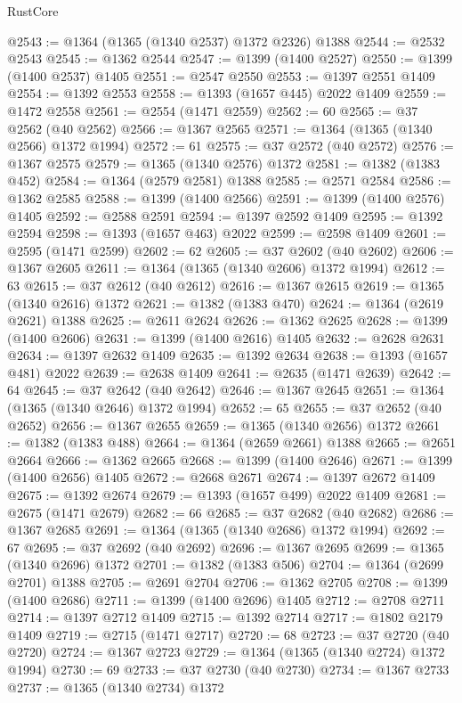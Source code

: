 \begin{lexlean}{RustCore}
\begin{coremodule}
@2543 := @1364 (@1365 (@1340 @2537) @1372 @2326) @1388
@2544 := @2532 @2543
@2545 := @1362 @2544
@2547 := @1399 (@1400 @2527)
@2550 := @1399 (@1400 @2537) @1405
@2551 := @2547 @2550
@2553 := @1397 @2551 @1409
@2554 := @1392 @2553
@2558 := @1393 (@1657 @445) @2022 @1409
@2559 := @1472 @2558
@2561 := @2554 (@1471 @2559)
@2562 := 60
@2565 := @37 @2562 (@40 @2562)
@2566 := @1367 @2565
@2571 := @1364 (@1365 (@1340 @2566) @1372 @1994)
@2572 := 61
@2575 := @37 @2572 (@40 @2572)
@2576 := @1367 @2575
@2579 := @1365 (@1340 @2576) @1372
@2581 := @1382 (@1383 @452)
@2584 := @1364 (@2579 @2581) @1388
@2585 := @2571 @2584
@2586 := @1362 @2585
@2588 := @1399 (@1400 @2566)
@2591 := @1399 (@1400 @2576) @1405
@2592 := @2588 @2591
@2594 := @1397 @2592 @1409
@2595 := @1392 @2594
@2598 := @1393 (@1657 @463) @2022
@2599 := @2598 @1409
@2601 := @2595 (@1471 @2599)
@2602 := 62
@2605 := @37 @2602 (@40 @2602)
@2606 := @1367 @2605
@2611 := @1364 (@1365 (@1340 @2606) @1372 @1994)
@2612 := 63
@2615 := @37 @2612 (@40 @2612)
@2616 := @1367 @2615
@2619 := @1365 (@1340 @2616) @1372
@2621 := @1382 (@1383 @470)
@2624 := @1364 (@2619 @2621) @1388
@2625 := @2611 @2624
@2626 := @1362 @2625
@2628 := @1399 (@1400 @2606)
@2631 := @1399 (@1400 @2616) @1405
@2632 := @2628 @2631
@2634 := @1397 @2632 @1409
@2635 := @1392 @2634
@2638 := @1393 (@1657 @481) @2022
@2639 := @2638 @1409
@2641 := @2635 (@1471 @2639)
@2642 := 64
@2645 := @37 @2642 (@40 @2642)
@2646 := @1367 @2645
@2651 := @1364 (@1365 (@1340 @2646) @1372 @1994)
@2652 := 65
@2655 := @37 @2652 (@40 @2652)
@2656 := @1367 @2655
@2659 := @1365 (@1340 @2656) @1372
@2661 := @1382 (@1383 @488)
@2664 := @1364 (@2659 @2661) @1388
@2665 := @2651 @2664
@2666 := @1362 @2665
@2668 := @1399 (@1400 @2646)
@2671 := @1399 (@1400 @2656) @1405
@2672 := @2668 @2671
@2674 := @1397 @2672 @1409
@2675 := @1392 @2674
@2679 := @1393 (@1657 @499) @2022 @1409
@2681 := @2675 (@1471 @2679)
@2682 := 66
@2685 := @37 @2682 (@40 @2682)
@2686 := @1367 @2685
@2691 := @1364 (@1365 (@1340 @2686) @1372 @1994)
@2692 := 67
@2695 := @37 @2692 (@40 @2692)
@2696 := @1367 @2695
@2699 := @1365 (@1340 @2696) @1372
@2701 := @1382 (@1383 @506)
@2704 := @1364 (@2699 @2701) @1388
@2705 := @2691 @2704
@2706 := @1362 @2705
@2708 := @1399 (@1400 @2686)
@2711 := @1399 (@1400 @2696) @1405
@2712 := @2708 @2711
@2714 := @1397 @2712 @1409
@2715 := @1392 @2714
@2717 := @1802 @2179 @1409
@2719 := @2715 (@1471 @2717)
@2720 := 68
@2723 := @37 @2720 (@40 @2720)
@2724 := @1367 @2723
@2729 := @1364 (@1365 (@1340 @2724) @1372 @1994)
@2730 := 69
@2733 := @37 @2730 (@40 @2730)
@2734 := @1367 @2733
@2737 := @1365 (@1340 @2734) @1372

\end{coremodule}
\end{lexlean}
